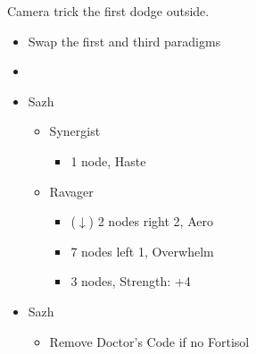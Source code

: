 Camera trick the first dodge outside.
	\begin{menu}
		\begin{itemize}
			\paradigm
			\begin{itemize}
				\item Swap the first and third paradigms
				\item {}%
				      {\paradigmline[1]{\textit{\syn}}{\textit{\sab}}{}}%
				      {\paradigmline{\com}{\med}{}}%
				      {\paradigmline{\com}{\rav}{}}%
				      {\paradigmline{\rav}{\rav}{}}%
				      {\paradigmline{[\rav]}{\sab}{}}%
				      {\paradigmline{[\com]}{\sab}{}}
			\end{itemize}
			\crystarium
			\begin{itemize}
				\item Sazh
				      \begin{itemize}
					      \item Synergist
					            \begin{itemize}
						            \item 1 node, Haste
					            \end{itemize}
					      \item Ravager
					            \begin{itemize}
						            \item ($\downarrow$) 2 nodes right 2, Aero
						            \item 7 nodes left 1, Overwhelm
						            \item 3 nodes, Strength: +4
					            \end{itemize}
				      \end{itemize}
			\end{itemize}
			\equip
			\begin{itemize}
				\item Sazh
				      \begin{itemize}
					      \item Remove Doctor's Code if no Fortisol
				      \end{itemize}
			\end{itemize}
		\end{itemize}
	\end{menu}
